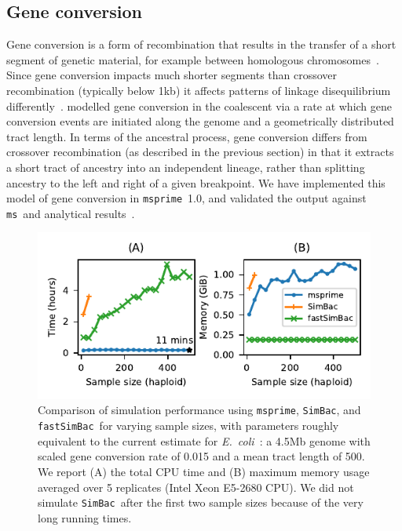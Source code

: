 \documentclass{article}
\newcommand{\msprime}[0]{\texttt{msprime}}
\newcommand{\ms}[0]{\texttt{ms}}
\newcommand{\SimBac}[0]{\texttt{SimBac}}
\newcommand{\FastSimBac}[0]{\texttt{fastSimBac}}
\begin{document}
\subsection*{Gene conversion}
Gene conversion is a form of recombination that results in the transfer
of a short segment of genetic material,
for example between homologous chromosomes~\citep{chen2007gene}.
Since gene conversion impacts much shorter segments than
crossover recombination (typically below 1kb) it
affects patterns of linkage disequilibrium differently~\citep{korunes2017gene}.
\cite{wiuf2000coalescent} modelled gene conversion in the coalescent
via a rate at which gene conversion events are initiated
along the genome and a geometrically distributed tract length.
In terms of the ancestral process, gene conversion differs from
crossover recombination (as described in the previous section)
in that it extracts a short tract of ancestry into
an independent lineage, rather than splitting ancestry
to the left and right of a given breakpoint.
We have implemented this model of gene
conversion in \msprime\ 1.0, and validated the output against
\ms\ and analytical results~\citep{wiuf2000coalescent}.

\begin{figure}
\begin{center}
\includegraphics[width=\textwidth]{figures/gc-perf}
\end{center}
\caption{\label{fig-gc-perf}Comparison of simulation performance
using \msprime, \SimBac, and \FastSimBac\ for varying sample sizes,
with parameters roughly equivalent to the current estimate
for \textit{E.~coli}~\citep{lapierre2016the}:
a 4.5Mb genome with scaled gene conversion rate of 0.015 and
a mean tract length of 500.
We report (A) the total CPU time and (B) maximum memory usage
averaged over 5 replicates (Intel Xeon E5-2680 CPU).
We did not simulate \SimBac\ after the first two sample sizes because
of the very long running times.}
\end{figure}
\end{document}
